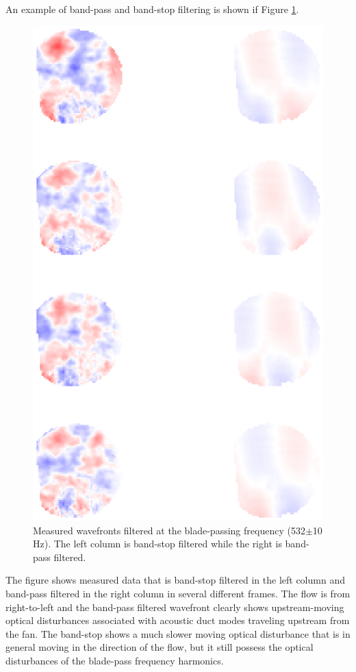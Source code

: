 An example of band-pass and band-stop filtering is shown if Figure \ref{fig:06_filter_temporal_bandpass}.
\begin{figure}
 \centering
 \includegraphics{../matlab/06_single_sensor_filtering/filter_temporal_bandpass.eps}
 \caption{Measured wavefronts filtered at the blade-passing frequency (532$\pm$10 Hz).  The left column is band-stop filtered while the right is band-pass filtered.}
 \label{fig:06_filter_temporal_bandpass}
\end{figure}
The figure shows measured data that is band-stop filtered in the left column and band-pass filtered in the right column in several different frames.
The flow is from right-to-left and the band-pass filtered wavefront clearly shows upstream-moving optical disturbances associated with acoustic duct modes traveling upstream from the fan.
The band-stop shows a much slower moving optical disturbance that is in general moving in the direction of the flow, but it still possess the optical disturbances of the blade-pass frequency harmonics.

